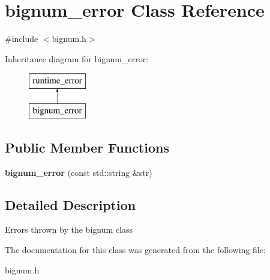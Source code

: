 \hypertarget{classbignum__error}{}\section{bignum\+\_\+error Class Reference}
\label{classbignum__error}


{\ttfamily \#include $<$bignum.\+h$>$}

Inheritance diagram for bignum\+\_\+error\+:\begin{figure}[H]
\begin{center}
\leavevmode
\includegraphics[height=2.000000cm]{classbignum__error}
\end{center}
\end{figure}
\subsection*{Public Member Functions}
\begin{DoxyCompactItemize}
\item 
\mbox{\label{classbignum__error_a500a3bab949914c4d3202cbb9241f10f}} 
{\bfseries bignum\+\_\+error} (const std\+::string \&str)
\end{DoxyCompactItemize}


\subsection{Detailed Description}
Errors thrown by the bignum class 

The documentation for this class was generated from the following file\+:\begin{DoxyCompactItemize}
\item 
bignum.\+h\end{DoxyCompactItemize}
